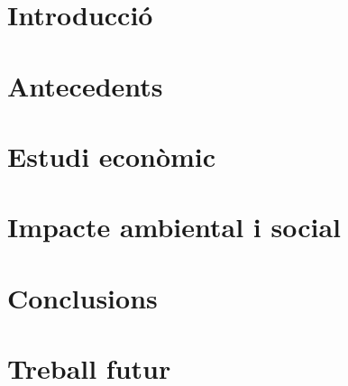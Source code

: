 \documentclass{tfgitic}[2024/07/01]
\title{}
\author{}
\begin{document}

\chapter{Introducció}
\chapter{Antecedents}


\chapter{Estudi econòmic}
\chapter{Impacte ambiental i social}
\chapter{Conclusions}
\chapter{Treball futur}


\printbibliography

\end{document}
